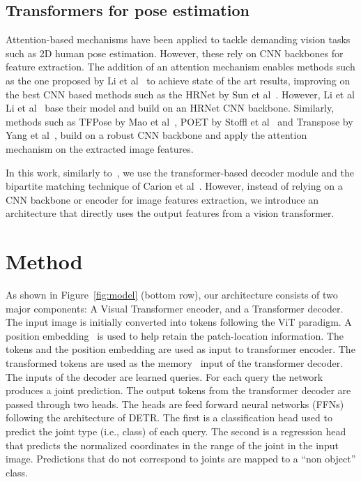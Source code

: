 \documentclass[runningheads]{llncs}
\begin{document}
\subsection{Transformers for pose estimation}
Attention-based mechanisms have been applied to tackle demanding vision tasks  such as 2D human pose estimation. However, these rely on CNN backbones for feature extraction. 
The addition of an attention mechanism enables methods such as the one proposed by Li et al~\cite{li2021pose} to achieve state of the art results, improving on the best CNN based methods such as the HRNet by Sun et al~\cite{sun2019deep}.
However, Li et al Li et al~\cite{li2021pose} base their model and build on an HRNet CNN backbone. Similarly, methods such as 
TFPose by Mao et al~\cite{mao2021tfpose}, POET by Stoffl et al~\cite{stoffl2021end} and 
Transpose by Yang et al~\cite{yang2021transpose}, build on a robust CNN backbone and 
apply the attention mechanism on the extracted image features.




In this work, similarly to~\cite{li2021pose}, we use the transformer-based decoder module 
and the bipartite matching technique of Carion et al~\cite{carion2020end}. However, instead of relying on a CNN backbone or encoder for image features extraction, we introduce an architecture that directly uses the output features from a vision transformer.






\section{Method}
\label{sec:method}


As shown in Figure~\ref{fig:model} (bottom row), our architecture consists of two major components: A Visual Transformer encoder, and a Transformer decoder. The input image is initially converted into tokens following the ViT paradigm.
A position embedding~\cite{vaswani2017attention} is used to help retain the patch-location information.
The tokens and the position embedding are used as input to transformer encoder.
The transformed tokens are used as the memory~\cite{carion2020end} input of the transformer decoder.
The inputs of the decoder are  learned queries.
For each query the network produces a joint prediction.
The output tokens from the transformer decoder are passed through two heads. The heads are feed forward neural networks (FFNs) following the architecture of DETR.
The first is a classification head used to predict the joint type (i.e., class) of each query.
The second is a regression head that predicts the normalized coordinates in the range  
of the joint in the input image.
Predictions that do not correspond to joints are mapped to a ``non object'' class.
\end{document}
